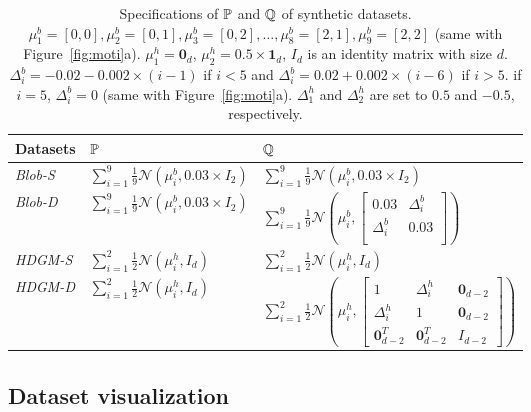 \documentclass{article}
\begin{document}
\begin{table}[ht]
  \centering
\caption{Specifications of $\P$ and $\Q$ of synthetic datasets. $\mu^b_1 = [0,0], \mu^b_2 = [0,1], \mu^b_3 = [0,2],\dots,\mu^b_8 = [2,1],\mu^b_9 = [2,2]$ (same with Figure~\ref{fig:moti}a). $\mu^h_1 = \textbf{0}_d$, $\mu^h_2 = 0.5 \times \textbf{1}_d$, $I_d$ is an identity matrix with size $d$. $\Delta^b_i=-0.02-0.002\times (i-1)$ if $i<5$ and $\Delta^b_i=0.02+0.002\times (i-6)$ if $i>5$. if $i=5$, $\Delta^b_i=0$ (same with Figure~\ref{fig:moti}a). $\Delta^h_1$ and $\Delta^h_2$ are set to $0.5$ and $-0.5$, respectively.}\label{tab:synthetic datasets}

    \begin{tabular}{lll}
    \toprule
    \rule{0em}{1em}Datasets & $\P$  & $\Q$ \rule{0em}{1em} \\
    \midrule
    \rule{0em}{1.5em}\emph{Blob-S} & $\sum_{i=1}^9\frac19\mathcal{N}({\mu}^b_i,0.03\times I_2)$ & $\sum_{i=1}^9\frac19\mathcal{N}({\mu}^b_i,0.03\times I_2)$ \\
    \rule{0em}{2em}\emph{Blob-D} & $\sum_{i=1}^9\frac19\mathcal{N}({\mu}^b_i,0.03\times I_2)$ & $\sum_{i=1}^9\frac19\mathcal{N}\left({\mu}^b_i,
\begin{bmatrix}
    0.03 & \Delta^b_i \\
    \Delta^b_i & 0.03  \\
\end{bmatrix}\right)$ \\
    \rule{0em}{1.5em}\emph{HDGM-S} & $\sum_{i=1}^2\frac12\mathcal{N}({\mu}^h_i,I_d)$ & $\sum_{i=1}^2\frac12\mathcal{N}({\mu}^h_i,I_d)$ \\
    \rule{0em}{2.2em}\emph{HDGM-D} & $\sum_{i=1}^2\frac12\mathcal{N}({\mu}^h_i,I_d)$ & $\sum_{i=1}^2\frac12\mathcal{N}\left({\mu}^h_i,
\begin{bmatrix}
    1 & \Delta^h_i& \textbf{0}_{d-2}  \\
    \Delta^h_i & 1& \textbf{0}_{d-2}  \\
    \textbf{0}_{d-2}^T & \textbf{0}_{d-2}^T & I_{d-2}
\end{bmatrix}\right)$ \\
    \bottomrule
    \end{tabular}\vspace{-0.5em}
\end{table}

\subsection{Dataset visualization}\label{Asec:data_visual}
\end{document}
